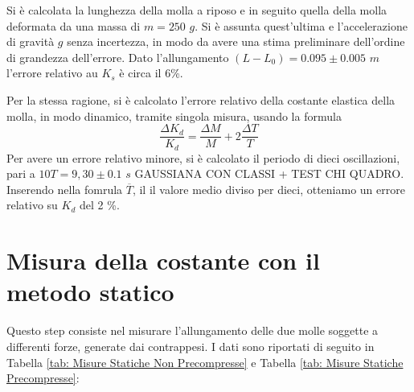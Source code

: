 \documentclass[12pt, a4paper]{article}
\begin{document}
Si è calcolata la lunghezza della molla a riposo e in seguito quella della molla deformata da una massa di $m=250$ $g$.
Si è assunta quest'ultima e l'accelerazione di gravità $g$ senza incertezza, in modo da avere una stima preliminare dell'ordine di grandezza dell'errore.
Dato l'allungamento $(L-L_0)=0.095\pm 0.005$ $m$ l'errore relativo au $K_s$ è circa il $6$\%.

Per la stessa ragione, si è calcolato l'errore relativo della costante elastica della molla, in modo dinamico, tramite singola misura, usando la formula 
\begin{equation*}
    \frac{\Delta K_d}{K_d}=\frac{\Delta M}{M}+2\frac{\Delta T}{T}
\end{equation*}
Per avere un errore relativo minore, si è calcolato il periodo di dieci oscillazioni, pari a $10T= 9,30 \pm 0.1$ $s$  GAUSSIANA CON CLASSI + TEST CHI QUADRO. Inserendo nella fomrula $\overline T$, il il valore medio diviso per dieci, otteniamo un errore relativo su $K_d$ del 2 \%.



\section{Misura della costante con il metodo statico}
Questo step consiste nel misurare l'allungamento delle due molle soggette a differenti forze, generate dai contrappesi. I dati sono riportati di seguito in Tabella \ref{tab: Misure Statiche Non Precompresse} e Tabella \ref{tab: Misure Statiche Precompresse}:
\\
\end{document}
